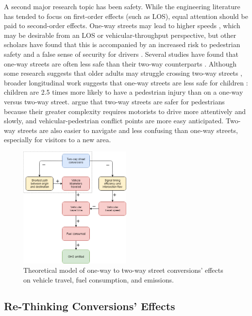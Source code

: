\documentclass{trbunofficial}
\begin{document}
A second major research topic has been safety. While the engineering literature has tended to focus on first-order effects (such as LOS), equal attention should be paid to second-order effects. One-way streets may lead to higher speeds \cite{schneider_pedestrian_2013}, which may be desirable from an LOS or vehicular-throughput perspective, but other scholars have found that this is accompanied by an increased risk to pedestrian safety \cite{swift_residential_1998} and a false sense of security for drivers \cite{holahan_psychological_2013}. Several studies have found that one-way streets are often less safe than their two-way counterparts \cite{ewing_urban_2003,riggs_two-way_2016,riggs_two-way_2015,ewing_built_2009}. Although some research suggests that older adults may struggle crossing two-way streets \cite{dommes_functional_2013}, broader longitudinal work suggests that one-way streets are less safe for children \cite{wazana_are_2000}: children are 2.5 times more likely to have a pedestrian injury than on a one-way versus two-way street. \citet{gayah_two-way_2012,gayah_analytical_2012} argue that two-way streets are safer for pedestrians because their greater complexity requires motorists to drive more attentively and slowly, and vehicular-pedestrian conflict points are more easy anticipated. Two-way streets are also easier to navigate and less confusing than one-way streets, especially for visitors to a new area.

\begin{figure}[tbp]
	\centering
	\includegraphics[width=0.5\textwidth]{figures/conversions_ghg.png}
	\caption{Theoretical model of one-way to two-way street conversions' effects on vehicle travel, fuel consumption, and emissions.}
	\label{fig:conversions_ghg}
\end{figure}

\subsection{Re-Thinking Conversions' Effects}
\end{document}

